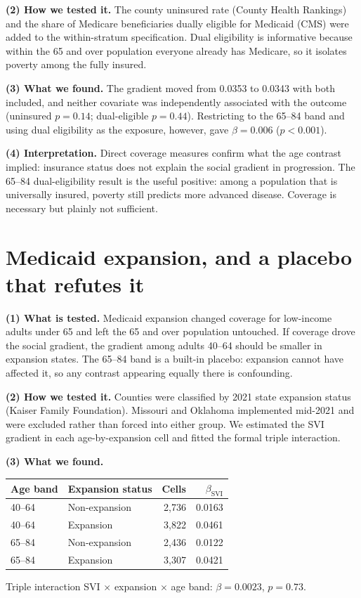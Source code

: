 \documentclass[11pt]{article}
\newcommand{\tpart}[1]{\medskip\noindent\textbf{#1}\quad}
\begin{document}
\tpart{(2) How we tested it.} The county uninsured rate (County Health Rankings)
and the share of Medicare beneficiaries dually eligible for Medicaid (CMS) were
added to the within-stratum specification. Dual eligibility is informative
because within the 65 and over population everyone already has Medicare, so it
isolates poverty among the fully insured.

\tpart{(3) What we found.} The gradient moved from 0.0353 to 0.0343 with both
included, and neither covariate was independently associated with the outcome
(uninsured $p = 0.14$; dual-eligible $p = 0.44$). Restricting to the 65--84 band
and using dual eligibility as the exposure, however, gave $\beta = 0.006$
($p<0.001$).

\tpart{(4) Interpretation.} Direct coverage measures confirm what the age
contrast implied: insurance status does not explain the social gradient in
progression. The 65--84 dual-eligibility result is the useful positive: among a
population that is universally insured, poverty still predicts more advanced
disease. Coverage is necessary but plainly not sufficient.

\section{Medicaid expansion, and a placebo that refutes it}

\tpart{(1) What is tested.} Medicaid expansion changed coverage for low-income
adults under 65 and left the 65 and over population untouched. If coverage drove
the social gradient, the gradient among adults 40--64 should be smaller in
expansion states. The 65--84 band is a built-in placebo: expansion cannot have
affected it, so any contrast appearing equally there is confounding.

\tpart{(2) How we tested it.} Counties were classified by 2021 state expansion
status (Kaiser Family Foundation). Missouri and Oklahoma implemented mid-2021
and were excluded rather than forced into either group. We estimated the SVI
gradient in each age-by-expansion cell and fitted the formal triple interaction.

\tpart{(3) What we found.}
\begin{center}
\begin{tabular}{llrr}
\toprule
Age band & Expansion status & Cells & $\beta_{\mathrm{SVI}}$ \\
\midrule
40--64 & Non-expansion & 2,736 & 0.0163 \\
40--64 & Expansion     & 3,822 & 0.0461 \\
65--84 & Non-expansion & 2,436 & 0.0122 \\
65--84 & Expansion     & 3,307 & 0.0421 \\
\bottomrule
\end{tabular}
\end{center}
Triple interaction SVI $\times$ expansion $\times$ age band: $\beta = 0.0023$,
$p = 0.73$.
\end{document}
